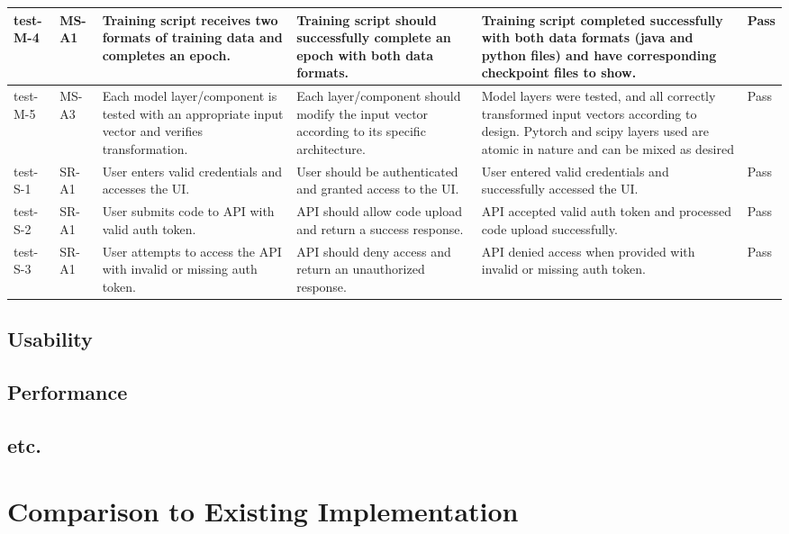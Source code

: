 \documentclass[12pt, titlepage]{article}
\begin{document}
\begin{longtable}[c]{|p{1.5cm}|p{1.5cm}|p{2.5cm}|p{2.5cm}|p{2.5cm}|p{1.5cm}|}
    \hline
    test-M-4 & MS-A1 & Training script receives two formats of training data 
    and completes an epoch. & Training script should successfully complete an 
    epoch with both data formats. & Training script completed successfully with 
    both data formats (java and python files) and have corresponding checkpoint
    files to show. & Pass \\
    \hline
    test-M-5 & MS-A3 & Each model layer/component is tested with an appropriate 
    input vector and verifies transformation. & Each layer/component should modify 
    the input vector according to its specific architecture. & Model layers were 
    tested, and all correctly transformed input vectors according to design. Pytorch 
    and scipy layers used are atomic in nature and can be mixed as desired & Pass \\
    \hline
    test-S-1 & SR-A1 & User enters valid credentials and accesses the UI. & User 
    should be authenticated and granted access to the UI. & User entered valid 
    credentials and successfully accessed the UI. & Pass \\
    \hline
    test-S-2 & SR-A1 & User submits code to API with valid auth token. & API 
    should allow code upload and return a success response. & API accepted 
    valid auth token and processed code upload successfully. & Pass \\
    \hline
    test-S-3 & SR-A1 & User attempts to access the API with invalid or missing 
    auth token. & API should deny access and return an unauthorized response. 
    & API denied access when provided with invalid or missing auth token. & Pass \\
    \hline
    \end{longtable}

\subsection{Usability}
		
\subsection{Performance}

\subsection{etc.}
	
\section{Comparison to Existing Implementation}	
\end{document}
